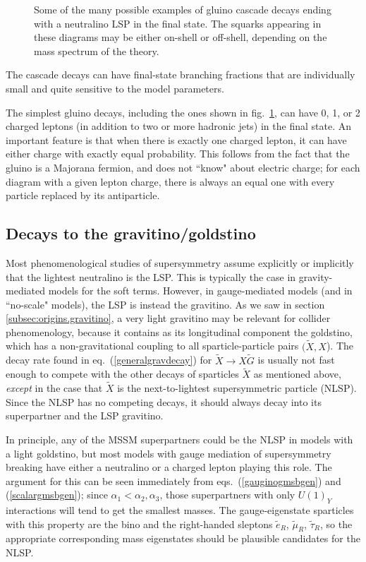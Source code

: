 \documentclass[12pt]{article}
\def\stilde{\widetilde}
\def\G{\stilde G}
\begin{document}
\begin{figure}
\caption{Some of the many possible examples of gluino cascade decays 
ending with a neutralino LSP in the final state. The squarks appearing in 
these diagrams may be either on-shell or off-shell, depending on the mass 
spectrum of the theory.\label{fig:gluinocascades}}
\end{figure}
The cascade decays can have final-state branching fractions that are 
individually small and quite sensitive to the model parameters.

The simplest gluino decays, including the ones shown in 
fig.~\ref{fig:gluinocascades}, can have 0, 1, or 2 charged leptons (in 
addition to two or more hadronic jets) in the final state.  An important 
feature is that when there is exactly one charged lepton, it can have 
either charge with exactly equal probability.  This follows from the fact 
that the gluino is a Majorana fermion, and does not ``know" about electric 
charge; for each diagram with a given lepton charge, there is always an 
equal one with every particle replaced by its antiparticle.

\subsection{Decays to the gravitino/goldstino}\label{subsec:decays.gravitino}
\setcounter{equation}{0}
\setcounter{footnote}{1}

Most phenomenological studies of supersymmetry assume explicitly or 
implicitly that the lightest neutralino is the LSP. This is typically the 
case in gravity-mediated models for the soft terms. However, in 
gauge-mediated models (and in ``no-scale" models), the LSP is instead the 
gravitino. As we saw in section \ref{subsec:origins.gravitino}, a very 
light gravitino may be relevant for collider phenomenology, because it 
contains as its longitudinal component the goldstino, which has a 
non-gravitational coupling to all sparticle-particle pairs $(\stilde X, 
X$). The decay rate found in eq.~(\ref{generalgravdecay}) for $\stilde 
X\rightarrow X\G$ is usually not fast enough to compete with the other 
decays of sparticles $\stilde X$ as mentioned above, {\it except} in the 
case that $\stilde X$ is the next-to-lightest supersymmetric particle 
(NLSP). Since the NLSP has no competing decays, it should always decay 
into its superpartner and the LSP gravitino.

In principle, any of the MSSM superpartners could be the NLSP in models 
with a light goldstino, but most models with gauge mediation of 
supersymmetry breaking have either a neutralino or a charged lepton 
playing this role. The argument for this can be seen immediately from 
eqs.~(\ref{gauginogmsbgen}) and (\ref{scalargmsbgen}); since $\alpha_1 < 
\alpha_2,\alpha_3$, those superpartners with only $U(1)_Y$ interactions 
will tend to get the smallest masses. The gauge-eigenstate sparticles with 
this property are the bino and the right-handed sleptons $\stilde e_R$, 
$\stilde \mu_R$, $\stilde \tau_R$, so the appropriate corresponding mass 
eigenstates should be plausible candidates for the NLSP.
\end{document}
